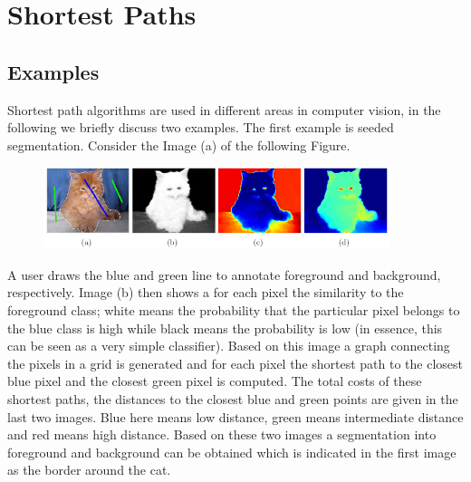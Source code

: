 \chapter{Shortest Paths}%
\label{chap:06}

\section{Examples}
Shortest path algorithms are used in different areas in computer vision, in the
following we briefly discuss two examples. The first example is seeded
segmentation. Consider the Image (a) of the following Figure.

\begin{figure}[H]
  \centering \includegraphics[width=0.9\textwidth]{Figures/cats}
\end{figure}

A user draws the blue and green line to annotate foreground and background,
respectively. Image (b) then shows a for each pixel the similarity to the
foreground class; white means the probability that the particular pixel belongs
to the blue class is high while black means the probability is low (in essence,
this can be seen as a very simple classifier). Based on this image a graph
connecting the pixels in a grid is generated and for each pixel the shortest
path to the closest blue pixel and the closest green pixel is computed. The
total costs of these shortest paths, \ie the distances to the closest blue and
green points are given in the last two images. Blue here means low distance,
green means intermediate distance and red means high distance. Based on these
two images a segmentation into foreground and background can be obtained which
is indicated in the first image as the border around the cat.

